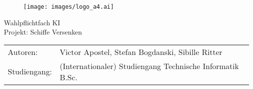 %
%
%
%
%
\begin{titlepage}
	\begin{figure}[lt] %
		\texttt{[image: images/logo\_a4.ai]}
	\end{figure}
	\begin{center}
		\Huge
		Wahlpflichtfach KI\\
		\vspace{1cm}
		\Large
		Projekt: Schiffe Versenken
	\end{center}	
	\vfill
	\begin{table}[H] %
		\centering
		\begin{tabular}{ll}
			Autoren: & Victor Apostel, Stefan Bogdanski, Sibille Ritter \\
			Studiengang: & (Internationaler) Studiengang Technische Informatik B.Sc. \\
		\end{tabular}
		\label{label}
	\end{table}
\end{titlepage}